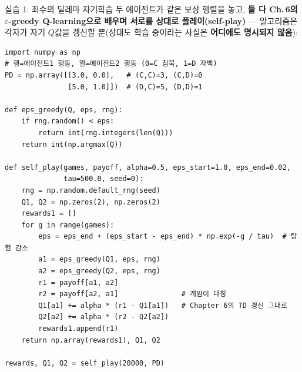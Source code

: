 \documentclass[aspectratio=169,11pt]{beamer}
\begin{document}

\begin{frame}[fragile]{실습 1: 죄수의 딜레마 자기학습}
  두 에이전트가 같은 보상 행렬을 놓고, \textbf{둘 다 Ch.\,6의
  $\varepsilon$-greedy Q-learning으로 배우며 서로를 상대로
  플레이(self-play)} --- 알고리즘은 각자가 자기 $Q$값을
  갱신할 뿐(상대도 학습 중이라는 사실은 \textbf{어디에도
  명시되지 않음}):
\begin{lstlisting}
import numpy as np
# 행=에이전트1 행동, 열=에이전트2 행동 (0=C 침묵, 1=D 자백)
PD = np.array([[3.0, 0.0],   # (C,C)=3, (C,D)=0
               [5.0, 1.0]])  # (D,C)=5, (D,D)=1

def eps_greedy(Q, eps, rng):
    if rng.random() < eps:
        return int(rng.integers(len(Q)))
    return int(np.argmax(Q))

def self_play(games, payoff, alpha=0.5, eps_start=1.0, eps_end=0.02,
              tau=500.0, seed=0):
    rng = np.random.default_rng(seed)
    Q1, Q2 = np.zeros(2), np.zeros(2)
    rewards1 = []
    for g in range(games):
        eps = eps_end + (eps_start - eps_end) * np.exp(-g / tau)  # 탐험 감소
        a1 = eps_greedy(Q1, eps, rng)
        a2 = eps_greedy(Q2, eps, rng)
        r1 = payoff[a1, a2]
        r2 = payoff[a2, a1]               # 게임이 대칭
        Q1[a1] += alpha * (r1 - Q1[a1])   # Chapter 6의 TD 갱신 그대로
        Q2[a2] += alpha * (r2 - Q2[a2])
        rewards1.append(r1)
    return np.array(rewards1), Q1, Q2

rewards, Q1, Q2 = self_play(20000, PD)
\end{lstlisting}
\end{frame}
\end{document}
